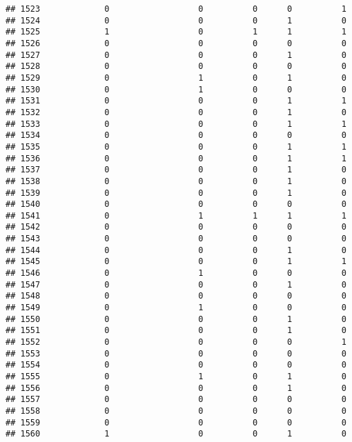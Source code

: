 \documentclass[
]{article}
\begin{document}
\begin{verbatim}
## 1523             0                  0          0      0          1
## 1524             0                  0          0      1          0
## 1525             1                  0          1      1          1
## 1526             0                  0          0      0          0
## 1527             0                  0          0      1          0
## 1528             0                  0          0      0          0
## 1529             0                  1          0      1          0
## 1530             0                  1          0      0          0
## 1531             0                  0          0      1          1
## 1532             0                  0          0      1          0
## 1533             0                  0          0      1          1
## 1534             0                  0          0      0          0
## 1535             0                  0          0      1          1
## 1536             0                  0          0      1          1
## 1537             0                  0          0      1          0
## 1538             0                  0          0      1          0
## 1539             0                  0          0      1          0
## 1540             0                  0          0      0          0
## 1541             0                  1          1      1          1
## 1542             0                  0          0      0          0
## 1543             0                  0          0      0          0
## 1544             0                  0          0      1          0
## 1545             0                  0          0      1          1
## 1546             0                  1          0      0          0
## 1547             0                  0          0      1          0
## 1548             0                  0          0      0          0
## 1549             0                  1          0      0          0
## 1550             0                  0          0      1          0
## 1551             0                  0          0      1          0
## 1552             0                  0          0      0          1
## 1553             0                  0          0      0          0
## 1554             0                  0          0      0          0
## 1555             0                  1          0      1          0
## 1556             0                  0          0      1          0
## 1557             0                  0          0      0          0
## 1558             0                  0          0      0          0
## 1559             0                  0          0      0          0
## 1560             1                  0          0      1          0

\end{verbatim}
\end{document}
